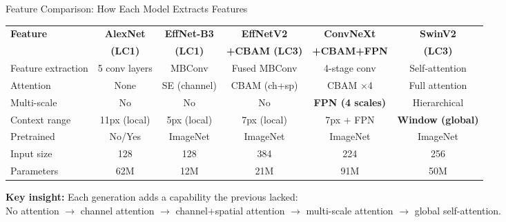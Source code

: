 \documentclass[aspectratio=169]{beamer}
\begin{document}
\begin{frame}{Feature Comparison: How Each Model Extracts Features}
    \begin{table}
        \centering
        \scriptsize
        \begin{tabular}{lccccc}
            \toprule
            \textbf{Feature} & \textbf{AlexNet} & \textbf{EffNet-B3} & \textbf{EffNetV2} & \textbf{ConvNeXt} & \textbf{SwinV2} \\
            & \textbf{(LC1)} & \textbf{(LC1)} & \textbf{+CBAM (LC3)} & \textbf{+CBAM+FPN} & \textbf{(LC3)} \\
            \midrule
            Feature extraction & 5 conv layers & MBConv & Fused MBConv & 4-stage conv & Self-attention \\
            Attention & None & SE (channel) & CBAM (ch+sp) & CBAM $\times$4 & Full attention \\
            Multi-scale & No & No & No & \textbf{FPN (4 scales)} & Hierarchical \\
            Context range & 11px (local) & 5px (local) & 7px (local) & 7px + FPN & \textbf{Window (global)} \\
            Pretrained & No/Yes & ImageNet & ImageNet & ImageNet & ImageNet \\
            Input size & 128 & 128 & 384 & 224 & 256 \\
            Parameters & 62M & 12M & 21M & 91M & 50M \\
            \bottomrule
        \end{tabular}
    \end{table}

    \vspace{0.2cm}
    \textbf{Key insight:} Each generation adds a capability the previous lacked:\\
    No attention $\to$ channel attention $\to$ channel+spatial attention $\to$ multi-scale attention $\to$ global self-attention.
\end{frame}
\end{document}
